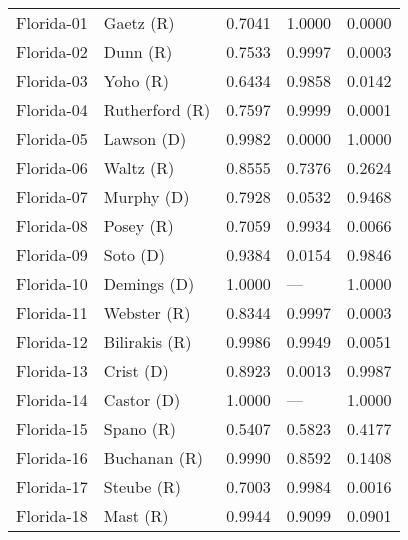 \begin{longtable}{llrll}
        Florida-01 &             {\color{Red} Gaetz (R)} &       0.7041 &        1.0000 &        0.0000 \\
        Florida-02 &              {\color{Red} Dunn (R)} &       0.7533 &        0.9997 &        0.0003 \\
        Florida-03 &              {\color{Red} Yoho (R)} &       0.6434 &        0.9858 &        0.0142 \\
        Florida-04 &        {\color{Red} Rutherford (R)} &       0.7597 &        0.9999 &        0.0001 \\
        Florida-05 &           {\color{Blue} Lawson (D)} &       0.9982 &        0.0000 &        1.0000 \\
        Florida-06 &             {\color{Red} Waltz (R)} &       0.8555 &        0.7376 &        0.2624 \\
        Florida-07 &           {\color{Blue} Murphy (D)} &       0.7928 &        0.0532 &        0.9468 \\
        Florida-08 &             {\color{Red} Posey (R)} &       0.7059 &        0.9934 &        0.0066 \\
        Florida-09 &             {\color{Blue} Soto (D)} &       0.9384 &        0.0154 &        0.9846 \\
        Florida-10 &          {\color{Blue} Demings (D)} &       1.0000 &           --- &        1.0000 \\
        Florida-11 &           {\color{Red} Webster (R)} &       0.8344 &        0.9997 &        0.0003 \\
        Florida-12 &         {\color{Red} Bilirakis (R)} &       0.9986 &        0.9949 &        0.0051 \\
        Florida-13 &            {\color{Blue} Crist (D)} &       0.8923 &        0.0013 &        0.9987 \\
        Florida-14 &           {\color{Blue} Castor (D)} &       1.0000 &           --- &        1.0000 \\
        Florida-15 &             {\color{Red} Spano (R)} &       0.5407 &        0.5823 &        0.4177 \\
        Florida-16 &          {\color{Red} Buchanan (R)} &       0.9990 &        0.8592 &        0.1408 \\
        Florida-17 &            {\color{Red} Steube (R)} &       0.7003 &        0.9984 &        0.0016 \\
        Florida-18 &              {\color{Red} Mast (R)} &       0.9944 &        0.9099 &        0.0901 \\

\end{longtable}

